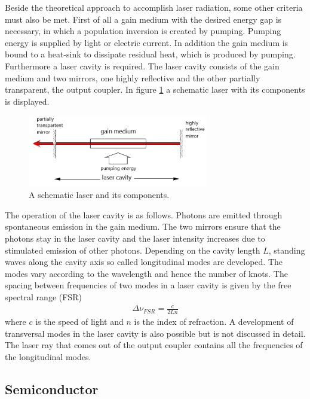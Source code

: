 Beside the theoretical approach to
accomplish laser radiation, some other criteria
must also be met.
First of all a gain medium with the desired
energy gap is necessary, in which
a population inversion is created by pumping.
Pumping energy is supplied by light or electric current.
In addition the gain medium is bound to a heat-sink
to dissipate residual heat, which is produced by pumping.
Furthermore a laser cavity is required.
The laser cavity consists of the gain medium and two
mirrors, one highly reflective and the other
partially transparent,
the output coupler.
In figure \ref{fig:laserschema}
a schematic laser with its components is displayed.
\begin{figure}
\centering
\includegraphics[width=0.7\textwidth]{laserkonzept.png}
\caption{A schematic laser and its components.
\cite{V61}}
\label{fig:laserschema}
\end{figure}
The operation of the laser cavity is as follows.
Photons are emitted through spontaneous emission
in the gain medium. The two mirrors
ensure that the photons stay in the laser cavity
and the laser intensity increases due to
stimulated emission of other photons.
Depending on the cavity length $L$,
standing waves along the cavity axis so called longitudinal modes
are developed.
The modes vary according to the wavelength and hence
the number of knots. The spacing
between frequencies of two modes in a laser
cavity is given by the free spectral range (FSR)
\begin{align}
\Delta \nu_{FSR} = \frac{c}{2Ln}
\end{align}
where $c$ is the speed of light and $n$ is
the index of refraction.
A development of transversal modes in the laser cavity
is also possible but is not discussed in detail.
The laser ray that comes out of the output coupler
contains all the frequencies of the longitudinal modes.

\subsection{Semiconductor}
\label{subsec:Semiconductor}

